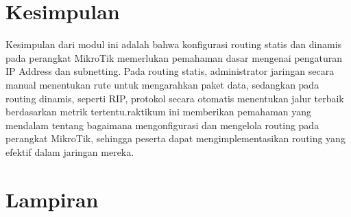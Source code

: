 \section{Kesimpulan}
Kesimpulan dari modul ini adalah bahwa konfigurasi routing statis dan dinamis pada perangkat MikroTik memerlukan pemahaman dasar mengenai pengaturan IP Address dan subnetting. Pada routing statis, administrator jaringan secara manual menentukan rute untuk mengarahkan paket data, sedangkan pada routing dinamis, seperti RIP, protokol secara otomatis menentukan jalur terbaik berdasarkan metrik tertentu.raktikum ini memberikan pemahaman yang mendalam tentang bagaimana mengonfigurasi dan mengelola routing pada perangkat MikroTik, sehingga peserta dapat mengimplementasikan routing yang efektif dalam jaringan mereka.

\section{Lampiran}

